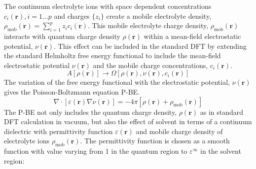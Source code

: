 \documentclass[journal=jacsat,manuscript=article]{achemso}
\newcommand{\bvec}[1]{\mathbf{#1}}
\newcommand*{\rvec}{\bvec{r}}
\newcommand*{\ofrvec}{\!\left(\rvec\right)}
\newcommand*{\dens}{\rho}
\newcommand*{\densmob}{\dens_{\textrm{mob}}}
\newcommand*{\ci}{c_i}
\newcommand*{\zi}{z_i}
\newcommand*{\pot}{\nu}
\newcommand*{\eps}{\varepsilon}
\newcommand*{\pbe}{P-BE}
\begin{document}
The continuum electrolyte ions with space dependent concentrations $\ci\ofrvec, i=1\dots p$ and charges $\{\zi\}$ create a mobile electrolyte density, $\densmob\ofrvec=\sum\limits_{i=1}^p\zi\ci\ofrvec$. This mobile electrolyte charge density, $\densmob\ofrvec$ interacts with quantum charge density $\dens\ofrvec$ within a mean-field electrostatic potential, $\pot\ofrvec$. This effect can be included in the standard DFT by extending the standard Helmholtz free energy functional to include the mean-field electrostatic potential $\pot\ofrvec$ and the mobile charge concentrations, $\ci\ofrvec$.\cite{Dziedzic2020}  
\begin{equation}
A\left[\dens\ofrvec\right]\rightarrow \Omega\left[\dens\ofrvec,\pot\ofrvec,\ci\ofrvec\right]
\end{equation}
The variation of the free energy functional with the electrostatic potential, $\pot\ofrvec$ gives the Poisson-Boltzmann equation \pbe{}.
\begin{equation}
\label{eq:pbe}
    \nabla\cdot\left[\eps\ofrvec\nabla\nu\ofrvec\right]=-4\pi\left[\dens\ofrvec+\densmob\ofrvec\right]
\end{equation}
The \pbe{} not only includes the quantum charge density, $\dens\ofrvec$ as in standard DFT calculation in vacuum, but also the effect of solvent in terms of a continuum dielectric with permittivity function $\eps\ofrvec$ and mobile charge density of electrolyte ions $\densmob\ofrvec$. The permittivity function is chosen as a smooth function with value varying from 1 in the quantum region to $\eps^\infty$ in the solvent region:\cite{Nattino2019}
\end{document}
